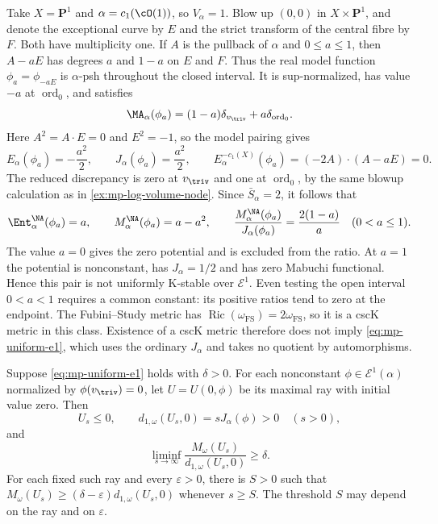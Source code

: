 \begin{example}\label{ex:mp-p1-stability-obstruction}
Take $X=\mathbf P^1$ and $\alpha=c_1(\cO(1))$, so $V_\alpha=1$. Blow up $(0,0)$ in $X\times\mathbf P^1$, and denote the exceptional curve by $E$ and the strict transform of the central fibre by $F$. Both have multiplicity one. If $A$ is the pullback of $\alpha$ and $0\leq a\leq1$, then $A-aE$ has degrees $a$ and $1-a$ on $E$ and $F$. Thus the real model function $\phi_a=\phi_{-aE}$ is $\alpha$-psh throughout the closed interval. It is sup-normalized, has value $-a$ at $\operatorname{ord}_0$, and satisfies
\[
 \MA_\alpha(\phi_a)
   =(1-a)\delta_{v_{\triv}}+a\delta_{\operatorname{ord}_0}.
\]
Here $A^2=A\cdot E=0$ and $E^2=-1$, so the model pairing gives
\[
 E_\alpha(\phi_a)=-\frac{a^2}{2},\qquad
 J_\alpha(\phi_a)=\frac{a^2}{2},\qquad
 E_\alpha^{-c_1(X)}(\phi_a)=(-2A)\cdot(A-aE)=0.
\]
The reduced discrepancy is zero at $v_{\triv}$ and one at $\operatorname{ord}_0$, by the same blowup calculation as in \cref{ex:mp-log-volume-node}. Since $\bar S_\alpha=2$, it follows that
\[
 \Ent_\alpha^{\NA}(\phi_a)=a,\qquad
 M_\alpha^{\NA}(\phi_a)=a-a^2,
 \qquad
 \frac{M_\alpha^{\NA}(\phi_a)}{J_\alpha(\phi_a)}
       =\frac{2(1-a)}a\quad(0<a\leq1).
\]
The value $a=0$ gives the zero potential and is excluded from the ratio. At $a=1$ the potential is nonconstant, has $J_\alpha=1/2$ and has zero Mabuchi functional. Hence this pair is not uniformly K-stable over $\mathcal E^1$. Even testing the open interval $0<a<1$ requires a common constant: its positive ratios tend to zero at the endpoint. The Fubini--Study metric has $\operatorname{Ric}(\omega_{\mathrm{FS}})=2\omega_{\mathrm{FS}}$, so it is a cscK metric in this class. Existence of a cscK metric therefore does not imply \eqref{eq:mp-uniform-e1}, which uses the ordinary $J_\alpha$ and takes no quotient by automorphisms.
\end{example}

\noindent\begin{minipage}{\linewidth}
\begin{corollary}\label{cor:mp-stability-maximal-ray-growth}
Suppose \eqref{eq:mp-uniform-e1} holds with $\delta>0$. For each nonconstant $\phi\in\mathcal E^1(\alpha)$ normalized by $\phi(v_{\triv})=0$, let $U=U(0,\phi)$ be its maximal ray with initial value zero. Then
\[
 U_s\leq0,\qquad d_{1,\omega}(U_s,0)=sJ_\alpha(\phi)>0
                  \quad(s>0),
\]
and
\[
       \liminf_{s\to\infty}
        \frac{M_\omega(U_s)}{d_{1,\omega}(U_s,0)}\geq\delta.
\]
For each fixed such ray and every $\varepsilon>0$, there is $S>0$ such that $M_\omega(U_s)\geq(\delta-\varepsilon)d_{1,\omega}(U_s,0)$ whenever $s\geq S$. The threshold $S$ may depend on the ray and on $\varepsilon$.
\end{corollary}
\end{minipage}\par

